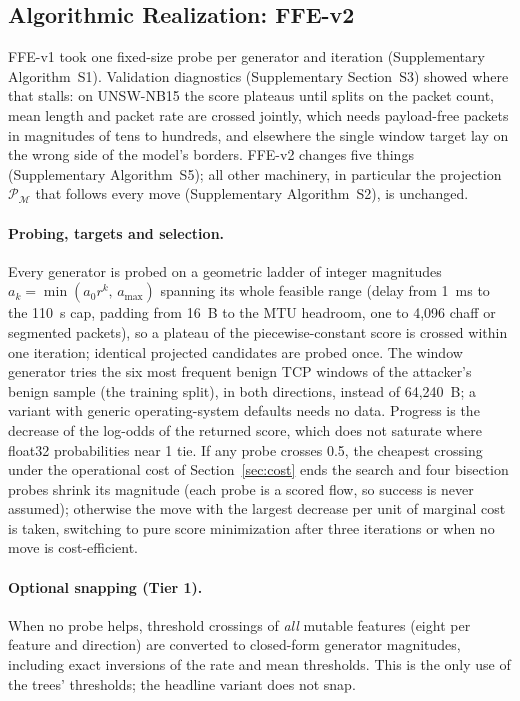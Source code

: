\subsection{Algorithmic Realization: FFE-v2}
\label{sec:algorithm}

FFE-v1 took one fixed-size probe per generator and iteration (Supplementary Algorithm~S1). Validation diagnostics (Supplementary Section~S3) showed where that stalls: on UNSW-NB15 the score plateaus until splits on the packet count, mean length and packet rate are crossed jointly, which needs payload-free packets in magnitudes of tens to hundreds, and elsewhere the single window target lay on the wrong side of the model's borders. FFE-v2 changes five things (Supplementary Algorithm~S5); all other machinery, in particular the projection $\mathcal{P}_{\mathcal{M}}$ that follows every move (Supplementary Algorithm~S2), is unchanged.



\paragraph{Probing, targets and selection.} Every generator is probed on a geometric ladder of integer magnitudes $a_k=\min(a_0r^k,\,a_{\max})$ spanning its whole feasible range (delay from 1~ms to the 110~s cap, padding from 16~B to the MTU headroom, one to 4,096 chaff or segmented packets), so a plateau of the piecewise-constant score is crossed within one iteration; identical projected candidates are probed once. The window generator tries the six most frequent benign TCP windows of the attacker's benign sample (the training split), in both directions, instead of 64,240~B; a variant with generic operating-system defaults needs no data. Progress is the decrease of the log-odds of the returned score, which does not saturate where float32 probabilities near 1 tie. If any probe crosses 0.5, the cheapest crossing under the operational cost of Section~\ref{sec:cost} ends the search and four bisection probes shrink its magnitude (each probe is a scored flow, so success is never assumed); otherwise the move with the largest decrease per unit of marginal cost is taken, switching to pure score minimization after three iterations or when no move is cost-efficient.

\paragraph{Optional snapping (Tier 1).} When no probe helps, threshold crossings of \emph{all} mutable features (eight per feature and direction) are converted to closed-form generator magnitudes, including exact inversions of the rate and mean thresholds. This is the only use of the trees' thresholds; the headline variant does not snap.


